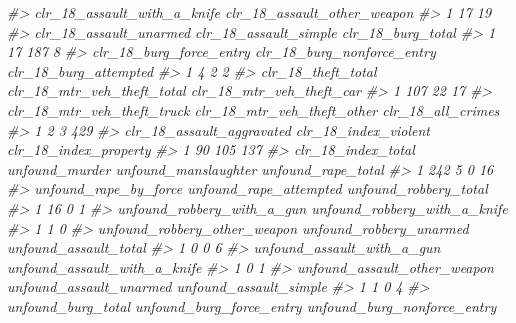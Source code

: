 \documentclass[
  12pt,
]{book}
\newenvironment{Shaded}{\begin{snugshade}}{\end{snugshade}}
\newcommand{\CommentTok}[1]{\textcolor[rgb]{0.37,0.37,0.37}{\textit{#1}}}
\begin{document}
\begin{Shaded}
\begin{Highlighting}[]
\CommentTok{\#\textgreater{}   clr\_18\_assault\_with\_a\_knife clr\_18\_assault\_other\_weapon}
\CommentTok{\#\textgreater{} 1                          17                          19}
\CommentTok{\#\textgreater{}   clr\_18\_assault\_unarmed clr\_18\_assault\_simple clr\_18\_burg\_total}
\CommentTok{\#\textgreater{} 1                     17                   187                 8}
\CommentTok{\#\textgreater{}   clr\_18\_burg\_force\_entry clr\_18\_burg\_nonforce\_entry clr\_18\_burg\_attempted}
\CommentTok{\#\textgreater{} 1                       4                          2                     2}
\CommentTok{\#\textgreater{}   clr\_18\_theft\_total clr\_18\_mtr\_veh\_theft\_total clr\_18\_mtr\_veh\_theft\_car}
\CommentTok{\#\textgreater{} 1                107                         22                       17}
\CommentTok{\#\textgreater{}   clr\_18\_mtr\_veh\_theft\_truck clr\_18\_mtr\_veh\_theft\_other clr\_18\_all\_crimes}
\CommentTok{\#\textgreater{} 1                          2                          3               429}
\CommentTok{\#\textgreater{}   clr\_18\_assault\_aggravated clr\_18\_index\_violent clr\_18\_index\_property}
\CommentTok{\#\textgreater{} 1                        90                  105                   137}
\CommentTok{\#\textgreater{}   clr\_18\_index\_total unfound\_murder unfound\_manslaughter unfound\_rape\_total}
\CommentTok{\#\textgreater{} 1                242              5                    0                 16}
\CommentTok{\#\textgreater{}   unfound\_rape\_by\_force unfound\_rape\_attempted unfound\_robbery\_total}
\CommentTok{\#\textgreater{} 1                    16                      0                     1}
\CommentTok{\#\textgreater{}   unfound\_robbery\_with\_a\_gun unfound\_robbery\_with\_a\_knife}
\CommentTok{\#\textgreater{} 1                          1                            0}
\CommentTok{\#\textgreater{}   unfound\_robbery\_other\_weapon unfound\_robbery\_unarmed unfound\_assault\_total}
\CommentTok{\#\textgreater{} 1                            0                       0                     6}
\CommentTok{\#\textgreater{}   unfound\_assault\_with\_a\_gun unfound\_assault\_with\_a\_knife}
\CommentTok{\#\textgreater{} 1                          0                            1}
\CommentTok{\#\textgreater{}   unfound\_assault\_other\_weapon unfound\_assault\_unarmed unfound\_assault\_simple}
\CommentTok{\#\textgreater{} 1                            1                       0                      4}
\CommentTok{\#\textgreater{}   unfound\_burg\_total unfound\_burg\_force\_entry unfound\_burg\_nonforce\_entry}

\end{Highlighting}
\end{Shaded}
\end{document}

